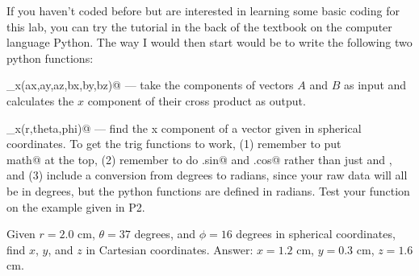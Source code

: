 If you haven't coded before but are interested in
learning some basic coding for this lab, you can try the tutorial in the back of
the textbook on the computer language Python.
The way I would then start would be to  write the following two python functions:

\verb@cross_x(ax,ay,az,bx,by,bz)@ --- 
take the components of vectors $A$ and $B$ as input and calculates the $x$ component of their cross product as output.

\verb@cart_x(r,theta,phi)@ ---
find the x component of a vector given in spherical coordinates.
To get the trig functions to work, (1) remember to put\\
 \verb@import math@ at the top, (2) remember to do \verb@math.sin@
and \verb@math.cos@ rather than just \verb@sin@ and \verb@cos@, and (3) include a conversion from degrees to radians, since
your raw data will all be in degrees, but the python functions are defined in radians. Test your function on the example
given in P2.

\prelab

\prelabquestion Given $r=2.0$ cm, $\theta=37$ degrees, and $\phi=16$ degrees in spherical coordinates, find $x$, $y$, and $z$
in Cartesian coordinates. Answer: $x=1.2$ cm, $y=0.3$ cm, $z=1.6$ cm.
